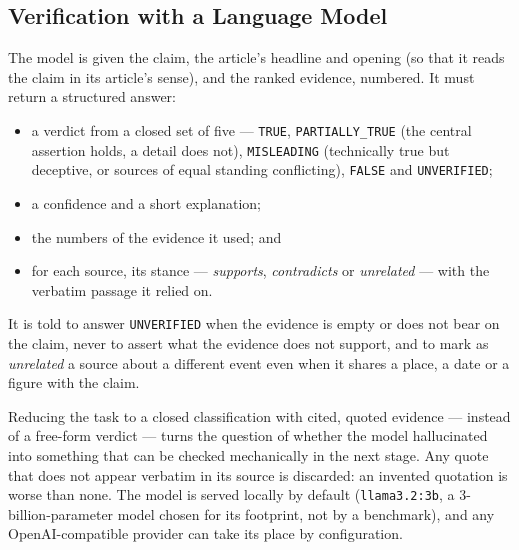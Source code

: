 
\subsection{Verification with a Language Model}
\label{subsec:llm-verification}

The model is given the claim, the article's headline and opening (so
that it reads the claim in its article's sense), and the ranked
evidence, numbered. It must return a structured answer:

\begin{itemize}
    \item a verdict from a closed set of five --- \texttt{TRUE},
    \texttt{PARTIALLY\_TRUE} (the central assertion holds, a detail does
    not), \texttt{MISLEADING} (technically true but deceptive, or
    sources of equal standing conflicting), \texttt{FALSE} and
    \texttt{UNVERIFIED};
    \item a confidence and a short explanation;
    \item the numbers of the evidence it used; and
    \item for each source, its stance --- \emph{supports},
    \emph{contradicts} or \emph{unrelated} --- with the verbatim passage
    it relied on.
\end{itemize}

It is told to answer \texttt{UNVERIFIED} when the evidence is empty or
does not bear on the claim, never to assert what the evidence does not
support, and to mark as \emph{unrelated} a source about a different
event even when it shares a place, a date or a figure with the claim.

Reducing the task to a closed classification with cited, quoted
evidence --- instead of a free-form verdict --- turns the question of
whether the model hallucinated into something that can be checked
mechanically in the next stage. Any quote that does not appear
verbatim in its source is discarded: an invented quotation is worse
than none. The model is served locally by default
(\texttt{llama3.2:3b}, a 3-billion-parameter model chosen for its
footprint, not by a benchmark), and any OpenAI-compatible provider can
take its place by configuration.

